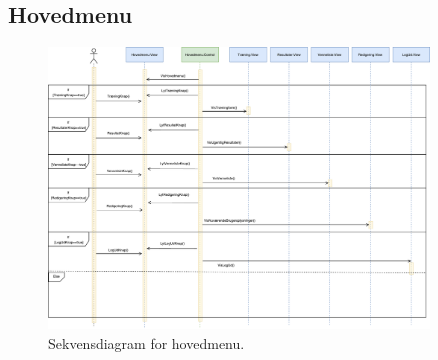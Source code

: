 \subsection*{Hovedmenu}

\begin{figure} [H]
\centering
\includegraphics[width=0.9\textwidth]{figures/Sek/SEKHovedmenu}
\caption{Sekvensdiagram for hovedmenu.}
\label{fig:SEKHovedmenu}
\end{figure}
